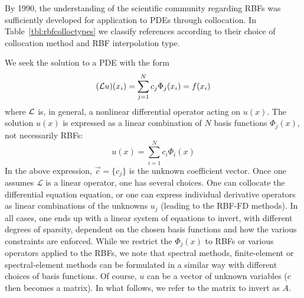 \documentclass{report}
\begin{document}
{By 1990, the understanding of the scientific community regarding RBFs was sufficiently developed for application to PDEs through 
collocation. In Table~\ref{tbl:rbfcolloctypes} we classify references according to their choice of collocation method and RBF 
interpolation type. 

We seek the solution to a PDE with the form
\begin{eqnarray*}
(\mathcal{L}u)(x_i) = \sum_{j=1}^{N} c_j \Phi_j(x_i) = f(x_i)
\end{eqnarray*}
where $\mathcal{L}$ is, in general, a nonlinear differential operator acting on $u(x)$. The solution $u(x)$ is expressed as a linear combination of $N$ basis functions $\Phi_j(x)$, not necessarily RBFs: 
$$
u(x) = \sum_{i=1}^N c_i \Phi_i(x)
$$
In the above expression, 
$ \vec{c} = \{c_j\} $ is the unknown coefficient vector. Once one assumes $\mathcal{L}$ is a linear operator, one has several choices. One can collocate the differential equation equation, or one can express individual derivative operators as linear combinations of the unknowns $u_j$ (leading to the RBF-FD methods). In all cases, one ends up with a linear system of equations to invert, with different degrees of sparsity, dependent on the chosen basis functions and how the various constraints are enforced.  While we restrict the $\Phi_j(x)$ to RBFs or various operators applied to the RBFs, we note that spectral methods, finite-element or spectral-element methods can be formulated in a similar way with different choices of basis functions.  Of course, $u$ can be a vector of unknown variables ($c$ then becomes a matrix). In what follows, we refer to the matrix to invert as $A$. 
%
%

}
\end{document}
